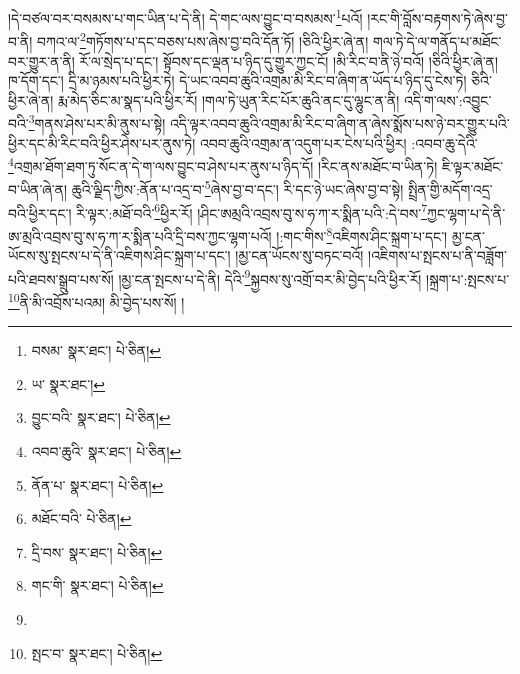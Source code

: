 །དེ་བཙལ་བར་བསམས་པ་གང་ཡིན་པ་དེ་ནི། དེ་གང་ལས་བྱུང་བ་བསམས་\footnote{བསམ་  སྣར་ཐང་།  པེ་ཅིན། }པའོ། །རང་གི་བློས་བརྟགས་ཏེ་ཞེས་བྱ་བ་ནི། བཀའ་ལ་\footnote{ཡ་  སྣར་ཐང་། }གཏོགས་པ་དང་བཅས་པས་ཞེས་བྱ་བའི་དོན་ཏོ། །ཅིའི་ཕྱིར་ཞེ་ན། གལ་ཏེ་དེ་ལ་གནོད་པ་མཐོང་བར་གྱུར་ན་ནི། རོ་ལ་སྲེད་པ་དང་། སྟོབས་དང་ལྡན་པ་ཉིད་དུ་གྱུར་ཀྱང་ངོ། །མི་རིང་བ་ནི་ཉེ་བའོ། །ཅིའི་ཕྱིར་ཞེ་ན། ཁ་དོག་དང་། དྲི་མ་ཉམས་པའི་ཕྱིར་ཏེ། དེ་ཡང་འབབ་ཆུའི་འགྲམ་མི་རིང་བ་ཞིག་ན་ཡོད་པ་ཉིད་དུ་ངེས་ཏེ། ཅིའི་ཕྱིར་ཞེ་ན། རྨ་མེད་ཅིང་མ་སྣད་པའི་ཕྱིར་རོ། །གལ་ཏེ་ཡུན་རིང་པོར་ཆུའི་ནང་དུ་ལྷུང་ན་ནི། འདི་ག་ལས་:འབྱུང་བའི་\footnote{བྱུང་བའི་  སྣར་ཐང་།  པེ་ཅིན། }གནས་ཤེས་པར་མི་ནུས་པ་སྟེ། འདི་ལྟར་འབབ་ཆུའི་འགྲམ་མི་རིང་བ་ཞིག་ན་ཞེས་སྨོས་པས་ཉེ་བར་གྱུར་པའི་ཕྱིར་དང་མི་རིང་བའི་ཕྱིར་ཤེས་པར་ནུས་ཏེ། འབབ་ཆུའི་འགྲམ་ན་འདུག་པར་ངེས་པའི་ཕྱིར། :འབབ་ཆུ་དེའི་\footnote{འབབ་ཆུའི་  སྣར་ཐང་།  པེ་ཅིན། }འགྲམ་ཐོག་ཐག་ཏུ་སོང་ན་དེ་ག་ལས་བྱུང་བ་ཤེས་པར་ནུས་པ་ཉིད་དོ། །རིང་ནས་མཐོང་བ་ཡིན་ཏེ། ཇི་ལྟར་མཐོང་བ་ཡིན་ཞེ་ན། ཆུའི་ལྗིད་ཀྱིས་:ནོན་པ་འདྲ་བ་\footnote{ནོན་པ་  སྣར་ཐང་།  པེ་ཅིན། }ཞེས་བྱ་བ་དང་། རི་དང་ཉེ་ཡང་ཞེས་བྱ་བ་སྟེ། སྤྲིན་གྱི་མདོག་འདྲ་བའི་ཕྱིར་དང་། རི་ལྟར་:མཐོ་བའི་\footnote{མཐོང་བའི་  པེ་ཅིན། }ཕྱིར་རོ། །ཤིང་ཨམྲའི་འབྲས་བུ་ས་ཧ་ཀ་ར་སྨིན་པའི་:དེ་བས་\footnote{དྲི་བས་  སྣར་ཐང་།  པེ་ཅིན། }ཀྱང་ལྷག་པ་དེ་ནི་ཨ་མྲའི་འབྲས་བུ་ས་ཧ་ཀ་ར་སྨིན་པའི་དྲི་བས་ཀྱང་ལྷག་པའོ། །:གང་གིས་\footnote{གང་གི་  སྣར་ཐང་།  པེ་ཅིན། }འཇིགས་ཤིང་སྐྲག་པ་དང་། མྱ་ངན་ཡོངས་སུ་སྤངས་པ་དེ་ནི་འཇིགས་ཤིང་སྐྲག་པ་དང་། །མྱ་ངན་ཡོངས་སུ་བཏང་བའོ། །འཇིགས་པ་སྤངས་པ་ནི་བཟློག་པའི་ཐབས་སྒྲུབ་པས་སོ། །མྱ་ངན་སྤངས་པ་དེ་ནི། དེའི་\footnote{}སྐྱབས་སུ་འགྲོ་བར་མི་བྱེད་པའི་ཕྱིར་རོ། །སྐྲག་པ་:སྤངས་པ་\footnote{སྤང་བ་  སྣར་ཐང་།  པེ་ཅིན། }ནི་མི་འབྲོས་པའམ། མི་བྱེད་པས་སོ། །
